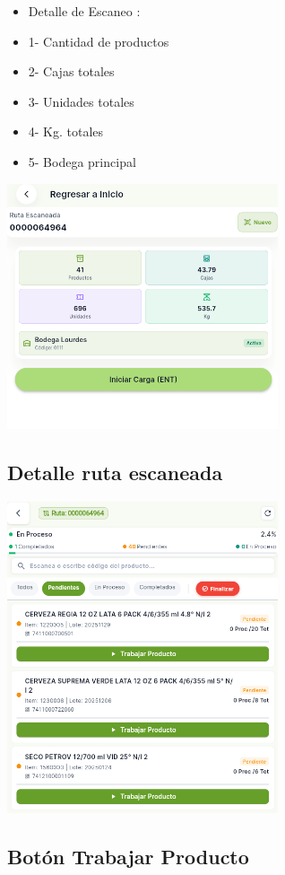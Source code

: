 \documentclass[12pt,a4paper]{report}
\begin{document}
\begin{itemize}[leftmargin=*]
    \item Detalle de Escaneo : 
    \item 1- Cantidad de productos
    \item 2- Cajas totales
    \item 3- Unidades totales
    \item 4- Kg. totales
    \item 5- Bodega principal
\end{itemize}
\includegraphics[width=0.6\textwidth]{pantallas/detalleEscaneo.png}

\subsection{Detalle ruta escaneada}
\includegraphics[width=0.6\textwidth]{pantallas/detalleRutaElaborada.png}

\subsection{Botón Trabajar Producto}
\end{document}
